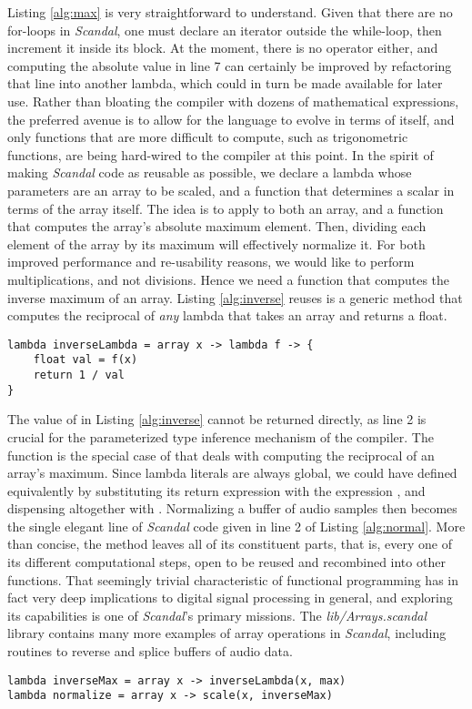 Listing \ref{alg:max} is very straightforward to understand. Given that there are no for-loops in \emph{Scandal}, one must declare an iterator outside the while-loop, then increment it inside its block. At the moment, there is no  operator either, and computing the absolute value in line 7 can certainly be improved by refactoring that line into another lambda, which could in turn be made available for later use. Rather than bloating the compiler with dozens of mathematical expressions, the preferred avenue is to allow for the language to evolve in terms of itself, and only functions that are more difficult to compute, such as trigonometric functions, are being hard-wired to the compiler at this point. In the spirit of making \emph{Scandal} code as reusable as possible, we declare a  lambda whose parameters are an array to be scaled, and a function that determines a scalar in terms of the array itself. The idea is to apply to  both an array, and a function that computes the array's absolute maximum element. Then, dividing each element of the array by its maximum will effectively normalize it. For both improved performance and re-usability reasons, we would like to perform multiplications, and not divisions. Hence we need a function that computes the inverse maximum of an array. Listing \ref{alg:inverse} reuses is a generic method that computes the reciprocal of \emph{any} lambda that takes an array and returns a float.

\begin{lstlisting}[emph={lambda,array,float,return},emphstyle={\textbf},caption={Computing the inverse of an \il{array -> float} lambda.},label={alg:inverse}]
lambda inverseLambda = array x -> lambda f -> {
	float val = f(x)
	return 1 / val
}
\end{lstlisting}

The value of  in Listing \ref{alg:inverse} cannot be returned directly, as line 2 is crucial for the parameterized type inference mechanism of the compiler. The function  is the special case of  that deals with computing the reciprocal of an array's maximum. Since lambda literals are always global, we could have defined  equivalently by substituting its return expression with the expression , and dispensing altogether with . Normalizing a buffer of audio samples then becomes the single elegant line of \emph{Scandal} code given in line 2 of Listing \ref{alg:normal}. More than concise, the  method leaves all of its constituent parts, that is, every one of its different computational steps, open to be reused and recombined into other functions. That seemingly trivial characteristic of functional programming has in fact very deep implications to digital signal processing in general, and exploring its capabilities is one of \emph{Scandal}'s primary missions. The \emph{lib/Arrays.scandal} library contains many more examples of array operations in \emph{Scandal}, including routines to reverse and splice buffers of audio data.

\begin{lstlisting}[emph={lambda,array},emphstyle={\textbf},caption={Normalizing an array.},label={alg:normal}]
lambda inverseMax = array x -> inverseLambda(x, max)
lambda normalize = array x -> scale(x, inverseMax)
\end{lstlisting}